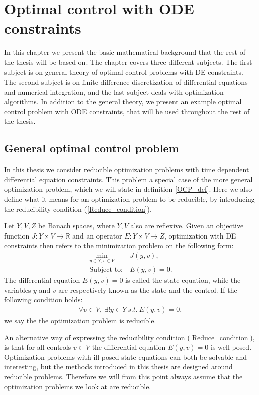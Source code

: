 \chapter{Optimal control with ODE constraints} \label{math_chap}
In this chapter we present the basic mathematical background that the rest of the thesis will be based on. The chapter covers three different subjects. The first subject is on general theory of optimal control problems with DE constraints. The second subject is on finite difference discretization of differential equations and numerical integration, and the last subject deals with optimization algorithms. In addition to the general theory, we present an example optimal control problem with ODE constraints, that will be used throughout the rest of the thesis. 
\section{General optimal control problem}
In this thesis we consider reducible optimization problems with time dependent differential equation constraints. This problem a special case of the more general optimization problem, which we will state in definition \ref{OCP_def}. Here we also define what it means for an optimization problem to be reducible, by introducing the reducibility condition (\ref{Reduce_condition}).
\begin{definition} \label{OCP_def}
Let $Y,V,Z$ be Banach spaces, where $Y,V$ also are reflexive. Given an objective function $J: Y\times V\rightarrow\mathbb{R}$ and an operator $E:Y\times V \rightarrow Z$, optimization with DE constraints then refers to the minimization problem on the following form:
\begin{align}
\underset{y\in Y,v\in V}{\text{min}} \ &J(y,v), \label{OCP_DEF_J}\\
\textrm{Subject to:} \ &E(y,v)=0. \label{OCP_DEF_E}
\end{align}
The differential equation $E(y,v)=0$ is called the state equation, while the variables $y$ and $v$ are respectively known as the state and the control. If the following condition holds:
\begin{align}
\forall v \in V, \ \exists! y \in Y \ s.t. \ E(y,v)=0, \label{Reduce_condition}
\end{align}
we say the the optimization problem is reducible.
\end{definition}
\noindent
An alternative way of expressing the reducibility condition (\ref{Reduce_condition}), is that for all controls $v\in V$ the differential equation $E(y,v)=0$ is well posed. Optimization problems with ill posed state equations can both be solvable and interesting, but the methods introduced in this thesis are designed around reducible problems. Therefore we will from this point always assume that the optimization problems we look at are reducible. 
